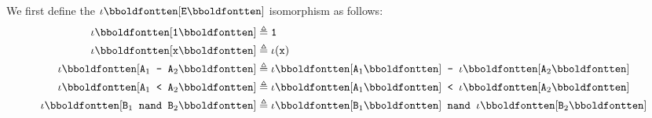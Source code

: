 %
\begin{answer}
  We first define the $\vren{\texttt{E}}$ isomorphism as follows:
  \begin{align*}
    \vren{\texttt{1}} &\isDefAs \texttt{1}\\
    \vren{\texttt{x}} &\isDefAs \iota(\texttt{x})\\
    \vren{\texttt{A}_1\texttt{ - }\texttt{A}_2} &\isDefAs \vren{\texttt{A}_1}\texttt{ - }\vren{\texttt{A}_2}\\
    \vren{\texttt{A}_1\texttt{ < }\texttt{A}_2} &\isDefAs \vren{\texttt{A}_1}\texttt{ < }\vren{\texttt{A}_2}\\
    \vren{\texttt{B}_1\texttt{ nand }\texttt{B}_2} &\isDefAs \vren{\texttt{B}_1}\texttt{ nand }\vren{\texttt{B}_2}\\
  \end{align*}
  

\end{answer}

